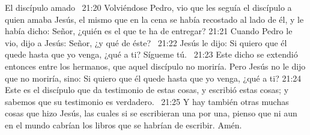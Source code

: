 El discípulo amado  
21:20 Volviéndose Pedro, vio que les seguía el discípulo a quien amaba Jesús, el mismo que en la cena se había recostado al lado de él, y le había dicho: Señor, ¿quién es el que te ha de entregar? 
21:21 Cuando Pedro le vio, dijo a Jesús: Señor, ¿y qué de éste?  
21:22 Jesús le dijo: Si quiero que él quede hasta que yo venga, ¿qué a ti? Sígueme tú.  
21:23 Este dicho se extendió entonces entre los hermanos, que aquel discípulo no moriría. Pero Jesús no le dijo que no moriría, sino: Si quiero que él quede hasta que yo venga, ¿qué a ti? 
21:24 Este es el discípulo que da testimonio de estas cosas, y escribió estas cosas; y sabemos que su testimonio es verdadero.  
21:25 Y hay también otras muchas cosas que hizo Jesús, las cuales si se escribieran una por una, pienso que ni aun en el mundo cabrían los libros que se habrían de escribir. Amén.  